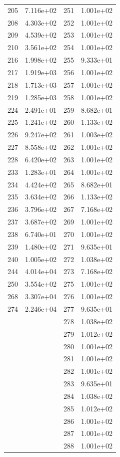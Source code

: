 \documentclass[12pt]{article}
\begin{document}
\begin{longtable}{@{}cccc@{}}
205 & 7.116e+02 & 251 & 1.001e+02 \\
208 & 4.303e+02 & 252 & 1.001e+02 \\
209 & 4.539e+02 & 253 & 1.001e+02 \\
210 & 3.561e+02 & 254 & 1.001e+02 \\
216 & 1.998e+02 & 255 & 9.333e+01 \\
217 & 1.919e+03 & 256 & 1.001e+02 \\
218 & 1.713e+03 & 257 & 1.001e+02 \\
219 & 1.285e+03 & 258 & 1.001e+02 \\
224 & 2.491e+01 & 259 & 8.682e+01 \\
225 & 1.241e+02 & 260 & 1.133e+02 \\
226 & 9.247e+02 & 261 & 1.003e+02 \\
227 & 8.558e+02 & 262 & 1.001e+02 \\
228 & 6.420e+02 & 263 & 1.001e+02 \\
233 & 1.283e+01 & 264 & 1.001e+02 \\
234 & 4.424e+02 & 265 & 8.682e+01 \\
235 & 3.634e+02 & 266 & 1.133e+02 \\
236 & 3.796e+02 & 267 & 7.168e+02 \\
237 & 3.687e+02 & 269 & 1.001e+02 \\
238 & 6.740e+01 & 270 & 1.001e+02 \\
239 & 1.480e+02 & 271 & 9.635e+01 \\
240 & 1.005e+02 & 272 & 1.038e+02 \\
244 & 4.014e+04 & 273 & 7.168e+02 \\
250 & 3.554e+02 & 275 & 1.001e+02 \\
268 & 3.307e+04 & 276 & 1.001e+02 \\
274 & 2.246e+04 & 277 & 9.635e+01 \\
 &  & 278 & 1.038e+02 \\
 &  & 279 & 1.012e+02 \\
 &  & 280 & 1.001e+02 \\
 &  & 281 & 1.001e+02 \\
 &  & 282 & 1.001e+02 \\
 &  & 283 & 9.635e+01 \\
 &  & 284 & 1.038e+02 \\
 &  & 285 & 1.012e+02 \\
 &  & 286 & 1.001e+02 \\
 &  & 287 & 1.001e+02 \\
 &  & 288 & 1.001e+02 \\

\end{longtable}
\end{document}
